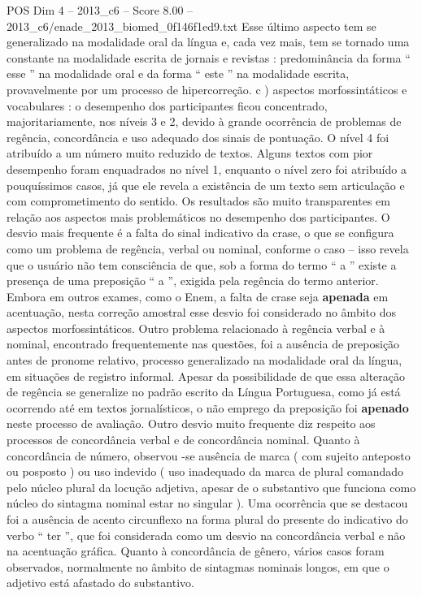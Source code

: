 \begin{textsample}{POS Dim 4 – 2013\_c6 – Score 8.00 – 2013\_c6/enade\_2013\_biomed\_0f146f1ed9.txt}
Esse último aspecto tem se generalizado na modalidade oral da língua e, cada vez mais, tem se tornado uma constante na modalidade escrita de jornais e revistas : predominância da forma “ esse ” na modalidade oral e da forma “ este ” na modalidade escrita, provavelmente por um processo de hipercorreção. c ) aspectos morfossintáticos e vocabulares : o desempenho dos participantes ficou concentrado, majoritariamente, nos níveis 3 e 2, devido à grande ocorrência de problemas de regência, concordância e uso adequado dos sinais de pontuação.
O nível 4 foi atribuído a um número muito reduzido de textos.
Alguns textos com pior desempenho foram enquadrados no nível 1, enquanto o nível zero foi atribuído a pouquíssimos casos, já que ele revela a existência de um texto sem articulação e com comprometimento do sentido.
Os resultados são muito transparentes em relação aos aspectos mais problemáticos no desempenho dos participantes.
O desvio mais frequente é a falta do sinal indicativo da crase, o que se configura como um problema de regência, verbal ou nominal, conforme o caso – isso revela que o usuário não tem consciência de que, sob a forma do termo “ a ” existe a presença de uma preposição “ a ”, exigida pela regência do termo anterior.
Embora em outros exames, como o Enem, a falta de crase seja \textbf{apenada} em acentuação, nesta correção amostral esse desvio foi considerado no âmbito dos aspectos morfossintáticos.
Outro problema relacionado à regência verbal e à nominal, encontrado frequentemente nas questões, foi a ausência de preposição antes de pronome relativo, processo generalizado na modalidade oral da língua, em situações de registro informal.
Apesar da possibilidade de que essa alteração de regência se generalize no padrão escrito da Língua Portuguesa, como já está ocorrendo até em textos jornalísticos, o não emprego da preposição foi \textbf{apenado} neste processo de avaliação.
Outro desvio muito frequente diz respeito aos processos de concordância verbal e de concordância nominal.
Quanto à concordância de número, observou -se ausência de marca ( com sujeito anteposto ou posposto ) ou uso indevido ( uso inadequado da marca de plural comandado pelo núcleo plural da locução adjetiva, apesar de o substantivo que funciona como núcleo do sintagma nominal estar no singular ).
Uma ocorrência que se destacou foi a ausência de acento circunflexo na forma plural do presente do indicativo do verbo “ ter ”, que foi considerada como um desvio na concordância verbal e não na acentuação gráfica.
Quanto à concordância de gênero, vários casos foram observados, normalmente no âmbito de sintagmas nominais longos, em que o adjetivo está afastado do substantivo.

\end{textsample}
